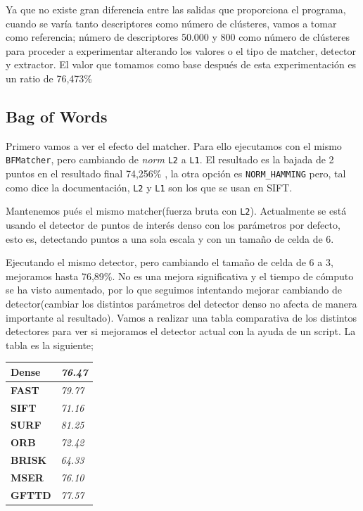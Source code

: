 \documentclass[a4paper,12pt]{article}
\begin{document}
Ya que no existe gran diferencia entre las salidas que proporciona el programa,
cuando se varía tanto descriptores como número de clústeres, vamos a tomar como
referencia; número de descriptores 50.000 y 800 como número de clústeres para
proceder a experimentar alterando los valores o el tipo de matcher, detector y
extractor. El valor que tomamos como base después de esta experimentación es
un ratio de 76,473\%

\subsection{Bag of Words}

Primero vamos a ver el efecto del matcher. Para ello ejecutamos con el mismo
\texttt{BFMatcher}, pero cambiando de \emph{norm} \texttt{L2} a \texttt{L1}. El resultado es la bajada de
2 puntos en el resultado final 74,256\% , la otra opción es \texttt{NORM\_HAMMING}
pero, tal como dice la documentación, \texttt{L2} y \texttt{L1} son los que se usan en SIFT.

Mantenemos pués el mismo matcher(fuerza bruta con \texttt{L2}).
Actualmente se está usando el detector de puntos de interés denso con los 
parámetros por defecto, esto es, detectando puntos a una sola escala y con un
tamaño de celda de 6. 

Ejecutando el mismo detector, pero cambiando el tamaño de  celda de 6 a 3, 
mejoramos hasta 76,89\%. No es una mejora significativa y el tiempo
de cómputo se ha visto aumentado, por lo que seguimos intentando mejorar 
cambiando de detector(cambiar los distintos parámetros del detector denso no
afecta de manera importante al resultado). 
Vamos a realizar una tabla comparativa de los distintos detectores para ver si
mejoramos el detector actual con la ayuda de un script. La tabla es la 
siguiente;
\begin{table}[h]
\centering
\begin{tabular}{|l|l|}
\hline

\textbf{Dense} & \textit{76.47} \\ \hline
\textbf{FAST}  & \textit{79.77} \\ \hline
\textbf{SIFT}  & \textit{71.16} \\ \hline
\textbf{SURF}  & \textit{81.25} \\ \hline
\textbf{ORB}   & \textit{72.42} \\ \hline
\textbf{BRISK} & \textit{64.33} \\ \hline
\textbf{MSER}  & \textit{76.10} \\ \hline
\textbf{GFTTD} & \textit{77.57} \\ \hline
\end{tabular}
\end{table}
\end{document}
